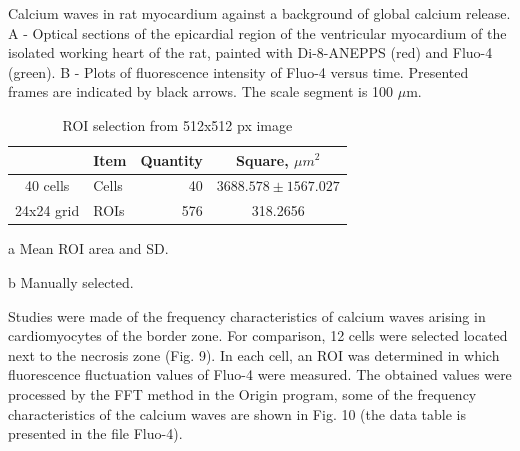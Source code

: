 \documentclass{biophys-new}
\begin{document}
Calcium waves in rat myocardium against a background of global calcium release. A - Optical sections of the epicardial region of the ventricular myocardium of the isolated working heart of the rat, painted with Di-8-ANEPPS (red) and Fluo-4 (green). B - Plots of fluorescence intensity of Fluo-4 versus time. Presented frames are indicated by black arrows. The scale segment is 100 $\mu$m.

\begin{table}[hb!]
\caption{ROI selection from 512x512 px image}
\label{tab:widgets}
\centering
\begin{threeparttable}
\begin{tabular}{c l r c}
\hline
 & Item & Quantity & Square, $\mu m^2$  \\\hline
40 cells\tnote{b} & Cells & 40 & $3688.578 \pm 1567.027$\tnote{a}  \\
24x24 grid & ROIs & 576 & 318.2656   \\
\hline
\end{tabular}
\begin{tablenotes}
\item[a] Mean ROI area and SD.
\item[b] Manually selected.
\end{tablenotes}
\end{threeparttable}
\end{table}


Studies were made of the frequency characteristics of calcium waves arising in cardiomyocytes of the border zone.
For comparison, 12 cells were selected located next to the necrosis zone (Fig. 9).
In each cell, an ROI was determined in which fluorescence fluctuation values of Fluo-4 were measured.
The obtained values were processed by the FFT method in the Origin program, some of the frequency characteristics of the calcium waves are shown in Fig. 10 (the data table is presented in the file Fluo-4).
\end{document}
